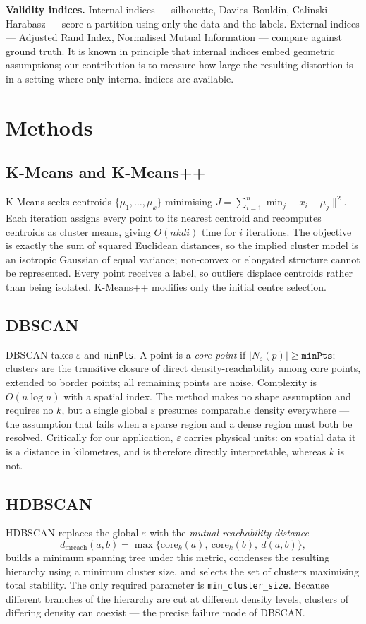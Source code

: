 \documentclass[11pt,a4paper]{article}
\begin{document}
\textbf{Validity indices.} Internal indices --- silhouette, Davies--Bouldin,
Calinski--Harabasz --- score a partition using only the data and the labels.
External indices --- Adjusted Rand Index, Normalised Mutual Information ---
compare against ground truth. It is known in principle that internal indices
embed geometric assumptions; our contribution is to measure how large the
resulting distortion is in a setting where only internal indices are available.

\section{Methods}

\subsection{K-Means and K-Means++}
K-Means seeks centroids $\{\mu_1,\dots,\mu_k\}$ minimising
$J=\sum_{i=1}^{n}\min_{j}\lVert x_i-\mu_j\rVert^2$. Each iteration assigns every
point to its nearest centroid and recomputes centroids as cluster means, giving
$O(nkdi)$ time for $i$ iterations. The objective is exactly the
sum of squared Euclidean distances, so the implied cluster model is an isotropic
Gaussian of equal variance; non-convex or elongated structure cannot be
represented. Every point receives a label, so outliers displace centroids rather
than being isolated. K-Means++ modifies only the initial centre selection.

\subsection{DBSCAN}
DBSCAN takes $\varepsilon$ and \texttt{minPts}. A point is a \emph{core point}
if $|N_\varepsilon(p)|\geq\texttt{minPts}$; clusters are the transitive closure
of direct density-reachability among core points, extended to border points; all
remaining points are noise. Complexity is $O(n\log n)$ with a spatial index.
The method makes no shape assumption and requires no $k$, but a single global
$\varepsilon$ presumes comparable density everywhere --- the assumption that
fails when a sparse region and a dense region must both be resolved.
Critically for our application, $\varepsilon$ carries physical units: on spatial
data it is a distance in kilometres, and is therefore directly interpretable,
whereas $k$ is not.

\subsection{HDBSCAN}
HDBSCAN replaces the global $\varepsilon$ with the \emph{mutual reachability
distance}
\[
d_{\text{mreach}}(a,b)=\max\bigl\{\text{core}_k(a),\ \text{core}_k(b),\ d(a,b)\bigr\},
\]
builds a minimum spanning tree under this metric, condenses the resulting
hierarchy using a minimum cluster size, and selects the set of clusters
maximising total stability. The only required parameter is
\texttt{min\_cluster\_size}. Because different branches of the hierarchy are cut
at different density levels, clusters of differing density can coexist --- the
precise failure mode of DBSCAN.
\end{document}
